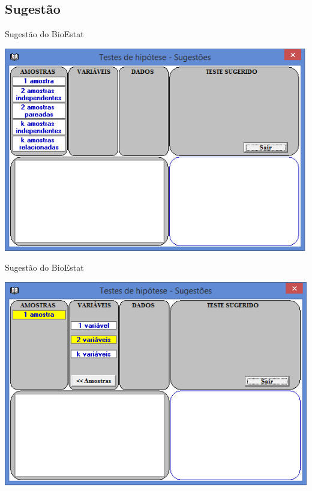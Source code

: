 \documentclass{beamer}
\begin{document}
\subsection{Sugestão}

\begin{frame}{Sugestão do BioEstat}
  \begin{center}
    \includegraphics[height=0.9\textheight]{Pratica_Assoc/sugestao1}
  \end{center}
\end{frame}

\begin{frame}{Sugestão do BioEstat}
  \begin{center}
    \includegraphics[height=0.9\textheight]{Pratica_Assoc/sugestao2}
  \end{center}
\end{frame}
\end{document}
